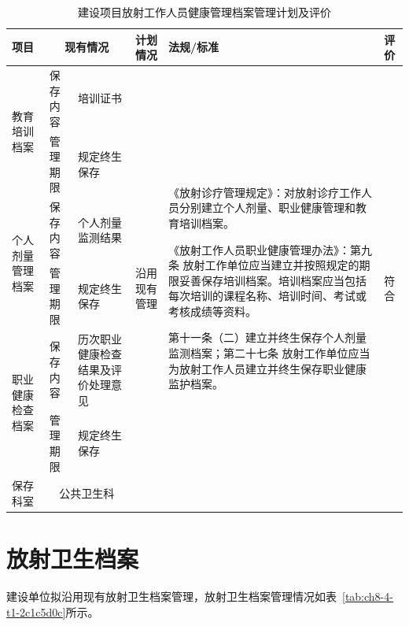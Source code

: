 \begin{table}[H]
\centering
\caption{建设项目放射工作人员健康管理档案管理计划及评价}
\label{tab:ch8-3-t5-9edc314a}
\renewcommand{\arraystretch}{1.5}
\begin{tabular}{|m{1.8cm}|m{1.8cm}|m{2.4cm}|m{1.8cm}|m{5cm}|m{1cm}|}
\hline
项目
& \multicolumn{2}{c|}{现有情况}
& 计划情况
& 法规/标准
& 评价 \\
\hline
\multirow{2}{=}{教育培训档案}
& 保存内容 & 培训证书
& \multirow{7}{=}{沿用现有管理}
& \multirow{7}{=}{《放射诊疗管理规定》：对放射诊疗工作人员分别建立个人剂量、职业健康管理和教育培训档案。

《放射工作人员职业健康管理办法》：第九条 放射工作单位应当建立并按照规定的期限妥善保存培训档案。培训档案应当包括每次培训的课程名称、培训时间、考试或考核成绩等资料。

第十一条（二）建立并终生保存个人剂量监测档案；第二十七条 放射工作单位应当为放射工作人员建立并终生保存职业健康监护档案。}
& \multirow{7}{=}{符合} \\
\cline{2-3}
& 管理期限 & 规定终生保存 & & & \\
\cline{1-3}

\multirow{2}{=}{个人剂量管理档案}
& 保存内容 & 个人剂量监测结果 & & & \\
\cline{2-3}
& 管理期限 & 规定终生保存 & & & \\
\cline{1-3}

\multirow{2}{=}{职业健康检查档案}
& 保存内容 & 历次职业健康检查结果及评价处理意见 & & & \\
\cline{2-3}
& 管理期限 & 规定终生保存 & & & \\
\cline{1-3}

保存科室
& \multicolumn{2}{c|}{公共卫生科}
& & & \\
\hline
\end{tabular}
\end{table}


\section{放射卫生档案}

建设单位拟沿用现有放射卫生档案管理，放射卫生档案管理情况如表~\ref{tab:ch8-4-t1-2c1c5d0c}所示。



